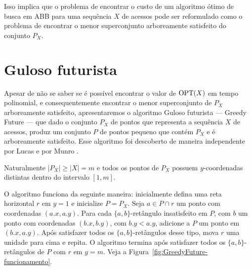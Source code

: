 
Isso implica que o problema de encontrar o custo de um algoritmo ótimo de busca em ABB para uma sequência $X$ de acessos pode ser reformulado como o problema de encontrar o menor superconjunto arboreamente satisfeito do conjunto $P_X$.

\section{Guloso futurista}

Apesar de não se saber se é possível encontrar o valor de $\mathrm{OPT}(X)$ em tempo polinomial, e consequentemente encontrar o menor superconjunto de $P_X$ arboreamente satisfeito, apresentaremos o algoritmo Guloso futurista --- Greedy Future --- que dado o conjunto $P_X$ de pontos que representa a sequência $X$ de acessos, produz um conjunto $P$ de pontos pequeno que contém $P_X$ e é arboreamente satisfeito. Esse algoritmo foi descoberto de maneira independente por Lucas \cite{lucas} e por Munro \cite{munro}.

Naturalmente $|P_X| \geq |X| = m$ e todos os pontos de $P_X$ possuem $y$-coordenadas distintas dentro do intervalo $[1,m]$. 

O algoritmo funciona da seguinte maneira: inicialmente defina uma reta horizontal $r$ em $y = 1$ e inicialize $P = P_X$. Seja $a \in P \cap r$ um ponto com coordenadas $(a.x, a.y)$. Para cada $\{a,b\}$-retângulo insatisfeito em $P$, com $b$ um ponto com coordenadas $(b.x, b.y)$, com $b.y < a.y$, adicione a $P$ um ponto em $(b.x, a.y)$. Após satisfazer todos os $\{a,b\}$-retângulos desse tipo, mova $r$ uma unidade para cima e repita. O algoritmo termina após satisfazer todos os $\{a,b\}$-retângulos de $P$ com $r$ em $y = m$. Veja a Figura~\ref{fig:GreedyFuture-funcionamento}.


